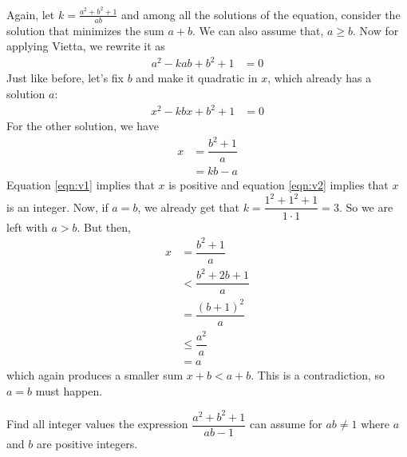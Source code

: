 \begin{solution}
	Again, let $k=\frac{a^2+b^2+1}{ab}$ and among all the solutions of the equation, consider the solution that minimizes the sum $a+b$. We can also assume that, $a\geq b$. Now for applying Vietta, we rewrite it as
		\begin{align*}
			a^2-kab+b^2+1 & = 0
		\end{align*}
	Just like before, let's fix $b$ and make it quadratic in $x$, which already has a solution $a$:
		\begin{align*}
			x^2-kbx+b^2+1 & = 0
		\end{align*}
	For the other solution, we have
		\begin{align}
			x & = \dfrac{b^2+1}{a}\label{eqn:v1}\\
	  & = kb-a\label{eqn:v2}
		\end{align}
	Equation \eqref{eqn:v1} implies that $x$ is positive and equation \eqref{eqn:v2} implies that $x$ is an integer. Now, if $a=b$, we already get that $k=\dfrac{1^2+1^2+1}{1\cdot1}=3$. So we are left with $a>b$. But then,
		\begin{align*}
			x
				& = \dfrac{b^2+1}{a}\\
				& < \dfrac{b^2+2b+1}{a}\\
				& = \dfrac{(b+1)^2}{a}\\
				& \leq\dfrac{a^2}{a}\\
				& = a
		\end{align*}
	which again produces a smaller sum $x+b<a+b$. This is a contradiction, so $a=b$ must happen.
\end{solution}

\begin{problem}
	Find all integer values the expression $\dfrac{a^2+b^2+1}{ab-1}$ can assume for $ab\neq1$ where $a$ and $b$ are positive integers.
\end{problem}

